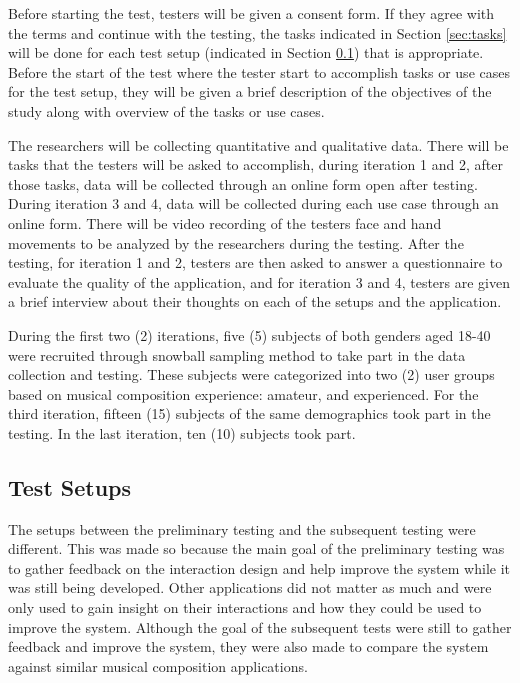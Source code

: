 Before starting the test, testers will be given a consent form. If they agree with the terms and continue with the testing, the tasks indicated in Section \ref{sec:tasks} will be done for each test setup (indicated in Section \ref{sec:test-setups}) that is appropriate. Before the start of the test where the tester start to accomplish tasks or use cases for the test setup, they will be given a brief description of the objectives of the study along with overview of the tasks or use cases. 

The researchers will be collecting quantitative and qualitative data. There will be tasks that the testers will be asked to accomplish, during iteration 1 and 2, after those tasks, data will be collected through an online form open after testing. During iteration 3 and 4, data will be collected during each use case through an online form. There will be video recording of the testers face and hand movements to be analyzed by the researchers during the testing. After the testing, for iteration 1 and 2, testers are then asked to answer a questionnaire to evaluate the quality of the application, and for iteration 3 and 4, testers are given a brief interview about their thoughts on each of the setups and the application.

During the first two (2) iterations, five (5) subjects of both genders aged 18-40 were recruited through snowball sampling method to take part in the data collection and testing. These subjects were categorized into two (2) user groups based on musical composition experience: amateur, and experienced. For the third iteration, fifteen (15) subjects of the same demographics took part in the testing. In the last iteration, ten (10) subjects took part. 

\subsection{Test Setups}
\label{sec:test-setups}

The setups between the preliminary testing and the subsequent testing were different. This was made so because the main goal of the preliminary testing was to gather feedback on the interaction design and help improve the system while it was still being developed. Other applications did not matter as much and were only used to gain insight on their interactions and how they could be used to improve the system. Although the goal of the subsequent tests were still to gather feedback and improve the system, they were also made to compare the system against similar musical composition applications. 

